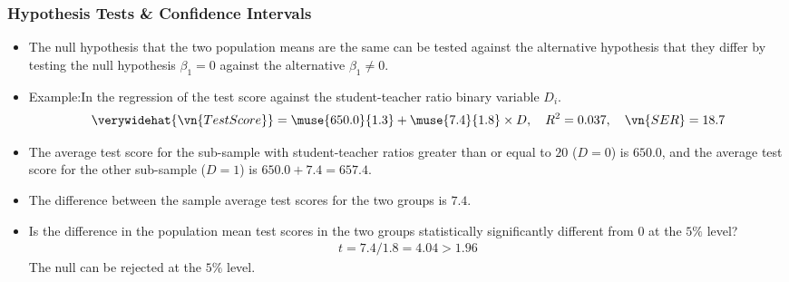 \begin{frame}
\frametitle{Hypothesis Tests \& Confidence Intervals}
\begin{itemize}
\item The null hypothesis that the two population means are the same can be tested against the alternative hypothesis that they differ by testing the null hypothesis $\beta_{1}=0$ against the alternative $\beta_{1}\ne0$. 
\item Example:In the regression of the test score against the student-teacher ratio binary variable $D_{i}$.
\begin{align*}
\verywidehat{\vn{TestScore}} 
  = \muse{650.0}{1.3} + \muse{7.4}{1.8} \times D,
  \quad R^2 = 0.037,
  \quad \vn{SER} = 18.7
\end{align*}
\item The average test score for the sub-sample with student-teacher ratios greater than or equal to $20$ ($D=0$) is $650.0$, and the average test score for the other sub-sample ($D=1$) is $650.0 + 7.4 = 657.4$. 
\item The difference between the sample average test scores for the two groups is $7.4$. 
\item Is the difference in the population mean test scores in the two groups statistically significantly different from $0$ at the $5\%$ level?
\begin{align*}
t = 7.4/1.8 = 4.04 > 1.96
\end{align*}
The null can be rejected at the $5\%$ level. 
\end{itemize}
\end{frame}


